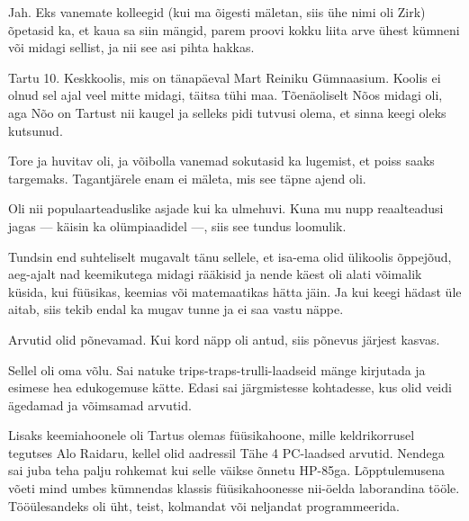 
Jah. Eks vanemate kolleegid (kui ma õigesti mäletan, siis ühe
nimi oli Zirk) õpetasid ka, et kaua sa siin mängid, parem proovi kokku liita arve 
ühest kümneni või midagi sellist, ja nii see asi pihta hakkas.


Tartu 10. Keskkoolis, mis on tänapäeval Mart 
Reiniku Gümnaasium. Koolis ei olnud sel ajal veel mitte midagi, täitsa tühi maa. 
Tõenäoliselt Nõos midagi oli, aga Nõo on Tartust nii kaugel ja 
selleks pidi tutvusi olema, et sinna keegi oleks kutsunud.


Tore ja huvitav oli, ja võibolla vanemad sokutasid ka lugemist, et 
poiss saaks targemaks. Tagantjärele enam ei mäleta, mis see täpne ajend oli.


Oli nii populaarteaduslike asjade kui ka ulmehuvi. Kuna mu nupp 
reaalteadusi jagas --- käisin ka olümpiaadidel ---, siis see 
tundus loomulik. 


Tundsin end suhteliselt mugavalt tänu sellele, et isa-ema olid ülikoolis õppejõud, 
aeg-ajalt nad keemikutega midagi rääkisid ja nende käest oli alati 
võimalik küsida, kui füüsikas, keemias või matemaatikas hätta jäin. 
Ja kui keegi hädast üle aitab, siis tekib endal ka mugav 
tunne ja ei saa vastu näppe.


Arvutid olid põnevamad. Kui kord näpp oli antud, siis põnevus järjest kasvas.


Sellel oli oma võlu. Sai natuke trips-traps-trulli-laadseid 
mänge kirjutada ja esimese hea edukogemuse kätte. Edasi sai 
järgmistesse kohtadesse, kus olid veidi ägedamad ja võimsamad arvutid.

Lisaks keemiahoonele oli Tartus olemas 
füüsikahoone, mille keldrikorrusel tegutses 
Alo Raidaru, kellel olid aadressil Tähe 4 PC-laadsed arvutid. Nendega sai juba teha palju rohkemat kui selle väikse 
õnnetu HP-85ga. Lõpptulemusena võeti mind umbes 
kümnendas klassis füüsikahoonesse nii-öelda laborandina tööle. 
Tööülesandeks oli üht, teist, kolmandat või neljandat programmeerida. 

